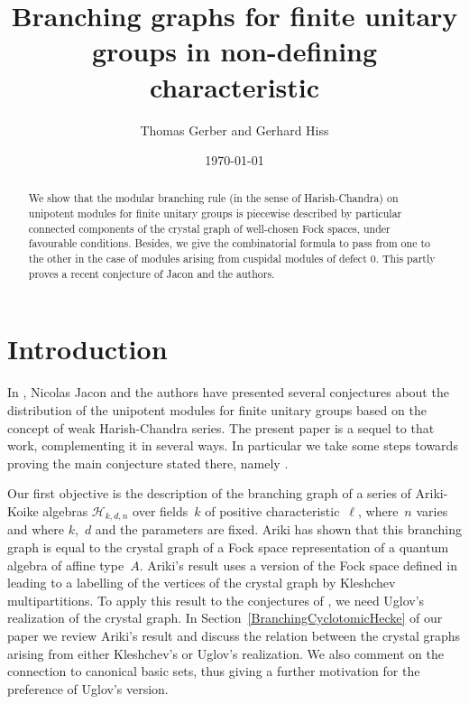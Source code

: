 \documentclass[twoside,12pt]{amsart}
\theoremstyle{plain}
\begin{document}
\date{\today}
\title{Branching graphs for finite unitary groups in non-defining characteristic}
\author{Thomas Gerber and Gerhard Hiss}

\address{Lehrstuhl D f\"ur Mathematik, RWTH Aachen University,
52062 Aachen, Germany}



\begin{abstract}
We show that the modular branching rule (in the sense of Harish-Chandra) on unipotent modules
for finite unitary groups is piecewise described by particular connected components of the 
crystal graph of well-chosen Fock spaces,
under favourable conditions.
Besides, we give the combinatorial formula to pass from one to the other
in the case of modules arising from cuspidal modules of defect $0$.
This partly proves a recent conjecture of Jacon and the authors.
\end{abstract}

\maketitle

\section{Introduction}

In \cite{GerberHissJacon2014},
Nicolas Jacon and the authors have presented several conjectures 
about the distribution of the unipotent modules for finite
unitary groups based on the concept of weak Harish-Chandra series.
The present paper is a sequel to that work, 
complementing it in several ways. In particular we take some steps 
towards proving the main conjecture stated there, 
namely \cite[Conjecture 5.7]{GerberHissJacon2014}.

Our first objective is the description of the branching graph of a series
of Ariki-Koike algebras $\mathcal{H}_{k,d,n}$ over fields~$k$ of positive 
characteristic~$\ell$, where~$n$ varies and where $k$,~$d$ and the 
parameters are fixed. Ariki has shown \cite[Theorem 6.1]{Ariki2007} that this 
branching graph is equal to the crystal graph of a Fock space representation 
of a quantum algebra of affine type~$A$. Ariki's result uses a version of the
Fock space defined in \cite{JMMO1991} leading to a labelling
of the vertices of the crystal graph by Kleshchev multipartitions.
To apply this result to the conjectures of \cite{GerberHissJacon2014},
we need Uglov's realization of the crystal graph. In Section~\ref{BranchingCyclotomicHecke} of
our paper we review Ariki's result and discuss the relation between the
crystal graphs arising from either Kleshchev's or Uglov's 
realization. We also comment on the connection to canonical basic sets,
thus giving a further motivation for the preference of Uglov's version.
\end{document}
